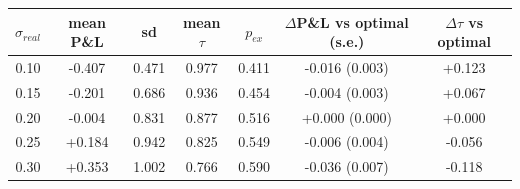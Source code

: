 \begin{tabular}{ccccccc}
\toprule
$\sigma_{real}$ & mean P\&L & sd & mean $\tau$ & $p_{ex}$ & $\Delta$P\&L vs optimal (s.e.) & $\Delta\tau$ vs optimal \\
\midrule
0.10 & -0.407 & 0.471 & 0.977 & 0.411 & -0.016 (0.003) & +0.123 \\
0.15 & -0.201 & 0.686 & 0.936 & 0.454 & -0.004 (0.003) & +0.067 \\
0.20 & -0.004 & 0.831 & 0.877 & 0.516 & +0.000 (0.000) & +0.000 \\
0.25 & +0.184 & 0.942 & 0.825 & 0.549 & -0.006 (0.004) & -0.056 \\
0.30 & +0.353 & 1.002 & 0.766 & 0.590 & -0.036 (0.007) & -0.118 \\
\bottomrule
\end{tabular}
